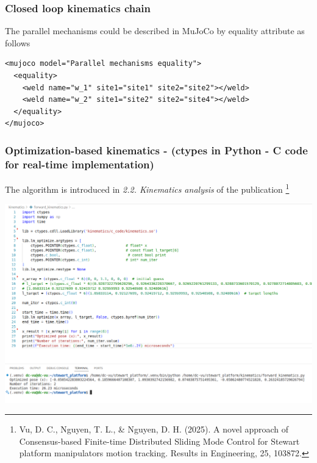 \documentclass[9pt]{beamer}
\begin{document}
		
		
			\begin{frame}[fragile]
				\frametitle{Closed loop kinematics chain}
				\begin{figure}
					\scalebox{0.7}{}
				\end{figure}
			
				The parallel mechanisms could be described in MuJoCo by equality attribute as follows
				\begin{verbatim}
<mujoco model="Parallel mechanisms equality">
  <equality>
    <weld name="w_1" site1="site1" site2="site2"></weld>
    <weld name="w_2" site1="site2" site2="site4"></weld>
  </equality>
</mujoco>
				\end{verbatim}
			\end{frame}
		
		
			
			\begin{frame}[fragile]
				\frametitle{Optimization-based kinematics - (ctypes in Python - C code for real-time implementation)}
				The algorithm is introduced in \textit{2.2. Kinematics analysis} of the publication \footnote{Vu, D. C., Nguyen, T. L., \& Nguyen, D. H. (2025). A novel approach of Consensus-based Finite-time Distributed Sliding Mode Control for Stewart platform manipulators motion tracking. Results in Engineering, 25, 103872.}
				\begin{center}
					\includegraphics[width=1\linewidth]{images/vscode-fk-stewart}
				\end{center}
			\end{frame}
		
\end{document}
